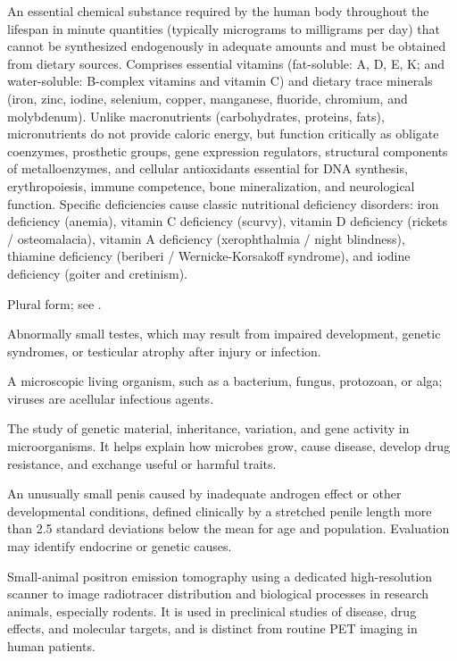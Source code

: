  An essential chemical substance required by the human body throughout the lifespan in minute quantities (typically micrograms to milligrams per day) that cannot be synthesized endogenously in adequate amounts and must be obtained from dietary sources. Comprises essential vitamins (fat-soluble: A, D, E, K; and water-soluble: B-complex vitamins and vitamin C) and dietary trace minerals (iron, zinc, iodine, selenium, copper, manganese, fluoride, chromium, and molybdenum). Unlike macronutrients (carbohydrates, proteins, fats), micronutrients do not provide caloric energy, but function critically as obligate coenzymes, prosthetic groups, gene expression regulators, structural components of metalloenzymes, and cellular antioxidants essential for DNA synthesis, erythropoiesis, immune competence, bone mineralization, and neurological function. Specific deficiencies cause classic nutritional deficiency disorders: iron deficiency (anemia), vitamin C deficiency (scurvy), vitamin D deficiency (rickets / osteomalacia), vitamin A deficiency (xerophthalmia / night blindness), thiamine deficiency (beriberi / Wernicke-Korsakoff syndrome), and iodine deficiency (goiter and cretinism).

 Plural form; see .

 Abnormally small testes, which may result from impaired development, genetic syndromes, or testicular atrophy after injury or infection.

 A microscopic living organism, such as a bacterium, fungus, protozoan, or alga; viruses are acellular infectious agents.

 The study of genetic material, inheritance, variation, and gene activity in microorganisms. It helps explain how microbes grow, cause disease, develop drug resistance, and exchange useful or harmful traits.

 An unusually small penis caused by inadequate androgen effect or other developmental conditions, defined clinically by a stretched penile length more than 2.5 standard deviations below the mean for age and population. Evaluation may identify endocrine or genetic causes.

 Small-animal positron emission tomography using a dedicated high-resolution scanner
to image radiotracer distribution and biological processes in research animals, especially rodents.
It is used in preclinical studies of disease, drug effects, and molecular
targets, and is distinct from routine PET imaging in human patients.

